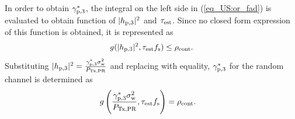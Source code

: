 {In order to obtain ${\gamma}_{\text{p,3}}^*$, the integral on the left side in (\ref{eq_US:or_fad}) is evaluated to obtain function of $|h_{\text{p,3}}|^2$ and $\tau_{\text{est}}$. Since no closed form expression of this function is obtained, it is represented as}
\begin{align*}
g(|h_{\text{p,3}}|^2, \tau_{\text{est}} f_{\text{s}}) \le \rho_{\text{cont}}. \nonumber   
\end{align*}
{Substituting $|h_{\text{p,3}}|^2 = \frac{{\gamma}_{\text{p,3}}^* \sigma^2_{\text{w}}}{P_{\text{Tx,PR}}}$ and replacing with equality, ${\gamma}_{\text{p,3}}^*$ for the random channel is determined as} 
\begin{align*}
g\left(\frac{{\gamma}_{\text{p,3}}^* \sigma^2_{\text{w}}}{P_{\text{Tx,PR}}}, \tau_{\text{est}} f_{\text{s}}\right) &= \rho_{\text{cont}}. \nonumber  
\end{align*}
\begin{figure}[!ht]


\centering
{}
\end{figure}
